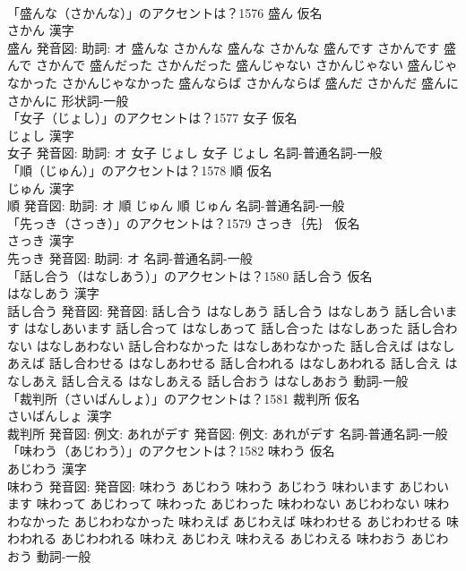 \documentclass[8pt]{extreport}
\begin{document}
\begin{CJK}{UTF8}{min}
\\	「盛んな（さかんな）」のアクセントは？1576	盛ん 仮名　
\\	さかん 漢字　
\\	盛ん 発音図: 助詞: オ	盛んな さかんな		盛んな さかんな 盛んです さかんです 盛んで さかんで 盛んだった さかんだった 盛んじゃない さかんじゃない 盛んじゃなかった さかんじゃなかった 盛んならば さかんならば 盛んだ さかんだ 盛んに さかんに				形状詞-一般 
\\	「女子（じょし）」のアクセントは？1577	女子 仮名　
\\	じょし 漢字　
\\	女子 発音図: 助詞: オ	女子 じょし		女子 じょし				名詞-普通名詞-一般 
\\	「順（じゅん）」のアクセントは？1578	順 仮名　
\\	じゅん 漢字　
\\	順 発音図: 助詞: オ	順 じゅん		順 じゅん				名詞-普通名詞-一般 
\\	「先っき（さっき）」のアクセントは？1579	さっき｛先｝ 仮名　
\\	さっき 漢字　
\\	先っき 発音図: 助詞: オ							名詞-普通名詞-一般 
\\	「話し合う（はなしあう）」のアクセントは？1580	話し合う 仮名　
\\	はなしあう 漢字　
\\	話し合う 発音図: 発音図:	話し合う はなしあう		話し合う はなしあう 話し合います はなしあいます 話し合って はなしあって 話し合った はなしあった 話し合わない はなしあわない 話し合わなかった はなしあわなかった 話し合えば はなしあえば 話し合わせる はなしあわせる 話し合われる はなしあわれる 話し合え はなしあえ 話し合える はなしあえる 話し合おう はなしあおう				動詞-一般 
\\	「裁判所（さいばんしょ）」のアクセントは？1581	裁判所 仮名　
\\	さいばんしょ 漢字　
\\	裁判所 発音図: 例文: あれがデす 発音図: 例文: あれがデす							名詞-普通名詞-一般 
\\	「味わう（あじわう）」のアクセントは？1582	味わう 仮名　
\\	あじわう 漢字　
\\	味わう 発音図: 発音図:	味わう あじわう		味わう あじわう 味わいます あじわいます 味わって あじわって 味わった あじわった 味わわない あじわわない 味わわなかった あじわわなかった 味わえば あじわえば 味わわせる あじわわせる 味わわれる あじわわれる 味わえ あじわえ 味わえる あじわえる 味わおう あじわおう				動詞-一般 

\end{CJK}
\end{document}
